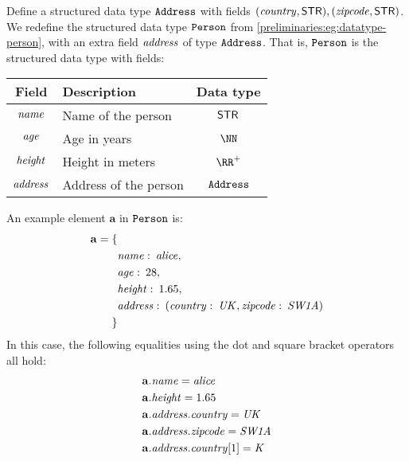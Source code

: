 \begin{example}\label{preliminaries:eg:datatype-person-deep}
  Define a structured data type ${\mathtt{Address}}$ with fields $(\mathit{country}, \mathsf{STR}{}), (\mathit{zipcode}, \mathsf{STR}{})$. We redefine the structured data type ${\mathtt{Person}}$ from \cref{preliminaries:eg:datatype-person}, with an extra field $\mathit{address}$ of type ${\mathtt{Address}}$. That is, ${\mathtt{Person}}$ is the structured data type with fields:
  \begin{table}[H]
    \centering
    \begin{tabular}{cp{15em}c}
      Field                 & Description           & Data type \\ \toprule
      $\mathit{name}$    & Name of the person    & $\mathsf{STR}{}$ \\ \midrule
      $\mathit{age}$     & Age in years          & $\NN$ \\ \midrule
      $\mathit{height}$  & Height in meters      & $\RR^+$ \\ \midrule
      $\mathit{address}$ & Address of the person & ${\mathtt{Address}}$ \\ \midrule
    \end{tabular}
  \end{table}
  An example element $\mathbf{a}$ in ${\mathtt{Person}}$ is:
  \begin{align*}
    \mathbf{a} =
    \{ &\\
       & \mathit{name}:\: \mathit{alice}, \\
       & \mathit{age}:\: 28, \\
       & \mathit{height}:\: 1.65, \\
       & \mathit{address}:\: (\mathit{country}:\: \mathit{UK}, \mathit{zipcode}:\: \mathit{SW1A})\\
    \}
  \end{align*}
  In this case, the following equalities using the dot and square bracket operators all hold:
  \begin{align*}
    & \mathbf{a}.\mathit{name} = \mathit{alice} \\
    & \mathbf{a}.\mathit{height} = 1.65 \\
    & \mathbf{a}.\mathit{address}.\mathit{country} = \mathit{UK} \\
    & \mathbf{a}.\mathit{address}.\mathit{zipcode} = \mathit{SW1A} \\
    & \mathbf{a}.\mathit{address}.\mathit{country}[1] = \mathit{K}
  \end{align*}
\end{example}

